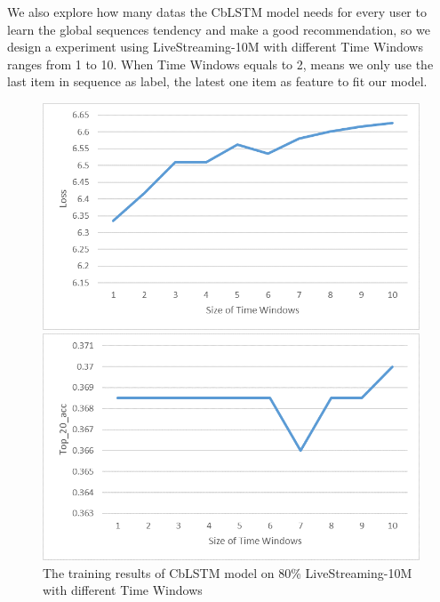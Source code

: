\documentclass[runningheads]{llncs}
\begin{document}
We also explore how many datas the CbLSTM model needs for every user to learn the global sequences tendency and make a good recommendation, so we design a experiment using LiveStreaming-10M with different Time Windows ranges from 1 to 10. When Time Windows equals to 2, means we only use the last item in sequence as label, the latest one item as feature to fit our model. 
\begin{figure}[!htb]
   \begin{minipage}{0.48\textwidth}
     \centering
     \includegraphics[width=\linewidth]{image/Loss_timewindows.png}
   \end{minipage}\hfill
   \begin {minipage}{0.48\textwidth}
     \centering
     \includegraphics[width=\linewidth]{image/Top_20_acc_timewindows.png}
   \end{minipage}
   \caption{The training results of CbLSTM model on 80\% LiveStreaming-10M with different Time Windows}
\end{figure}
\end{document}
